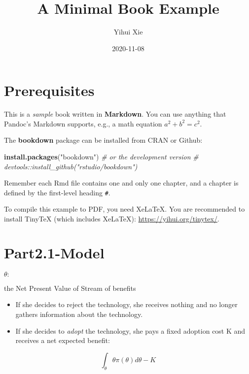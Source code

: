 \documentclass[
]{book}
\title{A Minimal Book Example}
\author{Yihui Xie}
\date{2020-11-08}
\newenvironment{Shaded}{\begin{snugshade}}{\end{snugshade}}
\newcommand{\CommentTok}[1]{\textcolor[rgb]{0.56,0.35,0.01}{\textit{#1}}}
\newcommand{\KeywordTok}[1]{\textcolor[rgb]{0.13,0.29,0.53}{\textbf{#1}}}
\newcommand{\NormalTok}[1]{#1}
\newcommand{\StringTok}[1]{\textcolor[rgb]{0.31,0.60,0.02}{#1}}
\begin{document}
\maketitle

{
\setcounter{tocdepth}{1}
\tableofcontents
}
\hypertarget{prerequisites}{%
\chapter{Prerequisites}\label{prerequisites}}

This is a \emph{sample} book written in \textbf{Markdown}. You can use anything that Pandoc's Markdown supports, e.g., a math equation \(a^2 + b^2 = c^2\).

The \textbf{bookdown} package can be installed from CRAN or Github:

\begin{Shaded}
\begin{Highlighting}[]
\KeywordTok{install.packages}\NormalTok{(}\StringTok{"bookdown"}\NormalTok{)}
\CommentTok{\# or the development version}
\CommentTok{\# devtools::install\_github("rstudio/bookdown")}
\end{Highlighting}
\end{Shaded}

Remember each Rmd file contains one and only one chapter, and a chapter is defined by the first-level heading \texttt{\#}.

To compile this example to PDF, you need XeLaTeX. You are recommended to install TinyTeX (which includes XeLaTeX): \url{https://yihui.org/tinytex/}.

\hypertarget{part2.1-model}{%
\chapter{Part2.1-Model}\label{part2.1-model}}

\(\theta:\)

the Net Present Value of Stream of benefits

\begin{itemize}
\item
  If she decides to reject the technology, she receives nothing and no longer gathers information about the technology.
\item
  If she decides to \emph{adopt} the technology, she pays a fixed adoption cost K and receives a net expected benefit:
\end{itemize}

\[\int_{\theta} \theta \pi(\theta)d\theta - K\]
\end{document}
